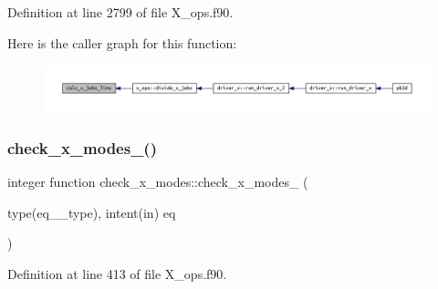 Definition at line 2799 of file X\+\_\+ops.\+f90.

Here is the caller graph for this function\+:
\nopagebreak
\begin{figure}[H]
\begin{center}
\leavevmode
\includegraphics[width=350pt]{X__ops_8f90_a58e5d0ffc9b2330a15d917aa8766a42a_icgraph}
\end{center}
\end{figure}
\mbox{\label{X__ops_8f90_a02770f90fcd38f73e7b6c7f267f17708}} 
\subsubsection{\texorpdfstring{check\+\_\+x\+\_\+modes\+\_()}{check\_x\_modes\_1()}}
{\footnotesize\ttfamily integer function check\+\_\+x\+\_\+modes\+::check\+\_\+x\+\_\+modes\+\_ (\begin{DoxyParamCaption}\item[{type(eq\+\_\+1\+\_\+type), intent(in)}]{eq }\end{DoxyParamCaption})}



Definition at line 413 of file X\+\_\+ops.\+f90.

